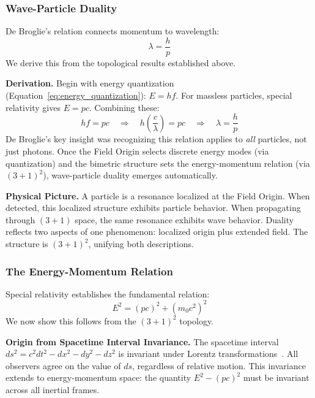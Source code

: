 \documentclass[aps,prd,preprint,superscriptaddress,showpacs,preprintnumbers,amsmath,amssymb,nofootinbib]{revtex4-2}
\begin{document}
\subsubsection*{Wave-Particle Duality}

De Broglie's relation connects momentum to wavelength:
\begin{equation}
\lambda = \frac{h}{p}
\label{eq:debroglie}
\end{equation}
We derive this from the topological results established above.

\textbf{Derivation.}
Begin with energy quantization (Equation~\ref{eq:energy_quantization}): $E = hf$. For massless particles, special relativity gives $E = pc$. Combining these:
\begin{equation}
hf = pc \quad \Rightarrow \quad h\left(\frac{c}{\lambda}\right) = pc \quad \Rightarrow \quad \lambda = \frac{h}{p}
\end{equation}
De Broglie's key insight was recognizing this relation applies to \emph{all} particles, not just photons. Once the Field Origin selects discrete energy modes (via quantization) and the bimetric structure sets the energy-momentum relation (via $(3+1)^2$), wave-particle duality emerges automatically.

\textbf{Physical Picture.}
A particle is a resonance localized at the Field Origin. When detected, this localized structure exhibits particle behavior. When propagating through $(3+1)$ space, the same resonance exhibits wave behavior. Duality reflects two aspects of one phenomenon: localized origin plus extended field. The structure is $(3+1)^2$, unifying both descriptions.

\subsubsection*{The Energy-Momentum Relation}

Special relativity establishes the fundamental relation:
\begin{equation}
E^2 = (pc)^2 + (m_0 c^2)^2
\label{eq:energy_momentum}
\end{equation}
We now show this follows from the $(3+1)^2$ topology.

\textbf{Origin from Spacetime Interval Invariance.}
The spacetime interval $ds^2 = c^2 dt^2 - dx^2 - dy^2 - dz^2$ is invariant under Lorentz transformations~\cite{weinberg1972}. All observers agree on the value of $ds$, regardless of relative motion. This invariance extends to energy-momentum space: the quantity $E^2 - (pc)^2$ must be invariant across all inertial frames.
\end{document}
